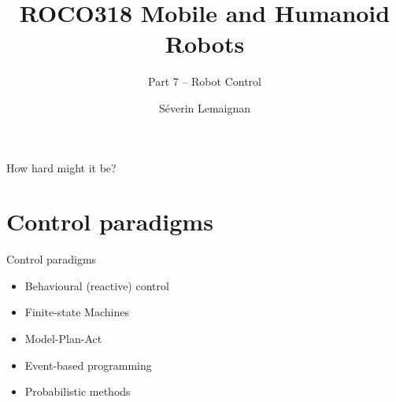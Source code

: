 \documentclass[compress]{beamer}
\title{ROCO318 \newline Mobile and Humanoid Robots}
\subtitle{Part 7 -- Robot Control}
\date{}
\author{Séverin Lemaignan}
\institute{Centre for Neural Systems and Robotics\\{\bf Plymouth University}}
\begin{document}

\maketitle

\begin{frame}[plain]{}

    \Large

    \centering
    How hard might it be?

\end{frame}



\section{Control paradigms}

\begin{frame}{Control paradigms}

    \begin{itemize}
        \item Behavioural (reactive) control
        \item Finite-state Machines
        \item Model-Plan-Act
        \item Event-based programming
        \item Probabilistic methods
    \end{itemize}
\end{frame}
\end{document}
